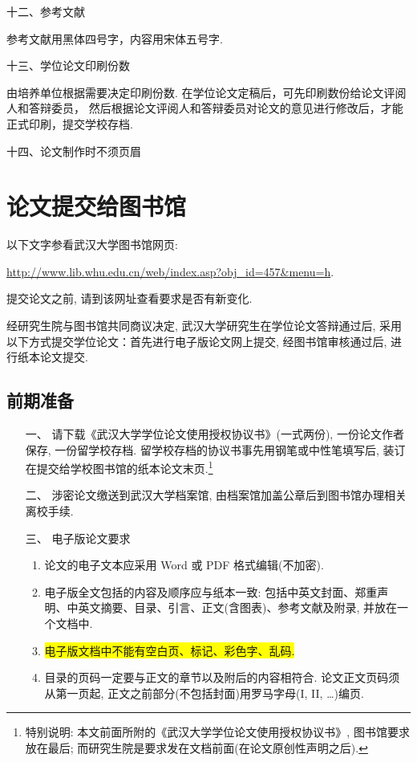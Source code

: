 \documentclass{WHUPhd}  %
\begin{document}
{\heiti 十二、参考文献}

参考文献用黑体四号字，内容用宋体五号字.

{\heiti 十三、学位论文印刷份数}

由培养单位根据需要决定印刷份数. 在学位论文定稿后，可先印刷数份给论文评阅人和答辩委员，
然后根据论文评阅人和答辩委员对论文的意见进行修改后，才能正式印刷，提交学校存档.

{\heiti 十四、论文制作时不须页眉}




\chapter{论文提交给图书馆}

{\kaishu 以下文字参看武汉大学图书馆网页:
 \begin{center}
 \url{http://www.lib.whu.edu.cn/web/index.asp?obj_id=457&menu=h}.
 \end{center}
 提交论文之前, 请到该网址查看要求是否有新变化.
}

    经研究生院与图书馆共同商议决定, 武汉大学研究生在学位论文答辩通过后,
    采用以下方式提交学位论文：首先进行电子版论文网上提交, 经图书馆审核通过后, 进行纸本论文提交.

\section*{前期准备}
\begin{itemize}
  \item[一、] 请下载《武汉大学学位论文使用授权协议书》(一式两份), 一份论文作者保存, 一份留学校存档.
    留学校存档的协议书事先用钢笔或中性笔填写后,  装订在提交给学校图书馆的纸本论文末页.\footnote{\heiti 特别说明:
    本文前面所附的《武汉大学学位论文使用授权协议书》, 图书馆要求放在最后;
    而研究生院是要求发在文档前面(在论文原创性声明之后). }

    \item[二、]涉密论文缴送到武汉大学档案馆, 由档案馆加盖公章后到图书馆办理相关离校手续.

    \item[三、]电子版论文要求
\begin{enumerate}[1.]
  \item 论文的电子文本应采用 Word 或 PDF 格式编辑(不加密).
  \item 电子版全文包括的内容及顺序应与纸本一致: 包括中英文封面、郑重声明、中英文摘要、目录、引言、正文(含图表)、参考文献及附录, 并放在一个文档中.
  \item \colorbox{yellow}{电子版文档中不能有空白页、标记、彩色字、乱码.}
  \item 目录的页码一定要与正文的章节以及附后的内容相符合. 论文正文页码须从第一页起, 正文之前部分(不包括封面)用罗马字母(I, II, \dots)编页.
\end{enumerate}
\end{itemize}
\end{document}
